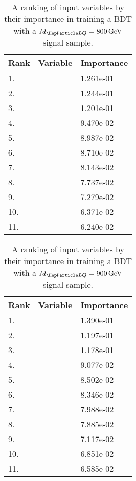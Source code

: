 \begin{table}[H]
	\caption{A ranking of input variables by their importance in training a BDT with a $\MLQ = \SI{800}{GeV}$ signal sample.}
	\begin{center}
		\begin{tabular}{lll} \hline \hline
			Rank & Variable & Importance  \\ \hline
			1. & \MujOne & 1.261e-01 \\
			2. & \MujTwo & 1.244e-01 \\
			3. & \ST & 1.201e-01 \\
			4. & \MET & 9.470e-02 \\
			5. & \Muujj & 8.987e-02 \\
			6. & \ptof{\PmuOne} & 8.710e-02 \\
			7. & \ptof{\PmuTwo} & 8.143e-02 \\
			8. & \ptof{\PjOne} & 7.737e-02 \\
			9. & \ptof{\PjTwo} & 7.279e-02 \\
			10. & \Muu & 6.371e-02 \\
			11. & \DRof{\PmuOne+\PmuTwo}{\PjOne} & 6.240e-02 \\ \hline \hline
		\end{tabular}
		\label{tab:bdtRank800}
	\end{center}
\end{table}

\begin{table}[H]
	\caption{A ranking of input variables by their importance in training a BDT with a $\MLQ = \SI{900}{GeV}$ signal sample.}
	\begin{center}
		\begin{tabular}{lll} \hline \hline
			Rank & Variable & Importance  \\ \hline
			1. & \ST & 1.390e-01 \\
			2. & \MujOne & 1.197e-01 \\
			3. & \MujTwo & 1.178e-01 \\
			4. & \Muujj & 9.077e-02 \\
			5. & \MET & 8.502e-02 \\
			6. & \ptof{\PmuTwo} & 8.346e-02 \\
			7. & \ptof{\PmuOne} & 7.988e-02 \\
			8. & \ptof{\PjTwo} & 7.885e-02 \\
			9. & \ptof{\PjOne} & 7.117e-02 \\
			10. & \DRof{\PmuOne+\PmuTwo}{\PjOne} & 6.851e-02 \\
			11. & \Muu & 6.585e-02 \\ \hline \hline
		\end{tabular}
		\label{tab:bdtRank900}
	\end{center}
\end{table}

